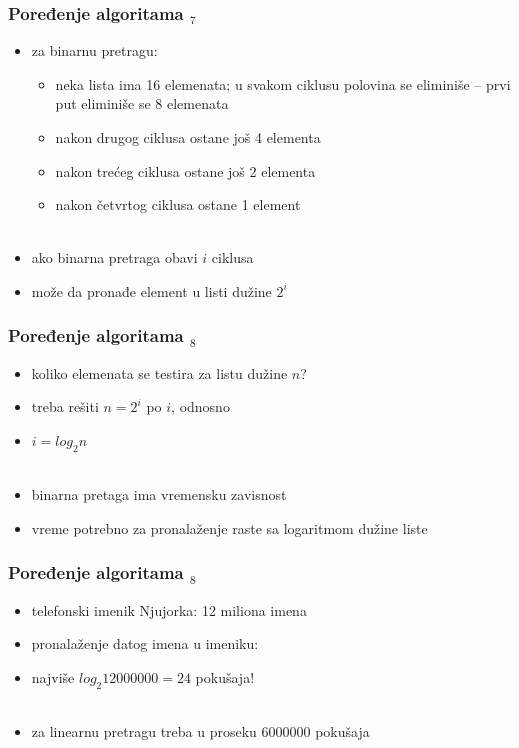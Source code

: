 \documentclass[utf8,compress,aspectratio=169]{beamer}
\begin{document}
\begin{frame}[fragile]
  \frametitle{Poređenje algoritama $_7$}
  \begin{itemize}
    \item za binarnu pretragu:
    \begin{itemize}
      \item neka lista ima 16 elemenata; u svakom ciklusu polovina se
        eliminiše -- prvi put eliminiše se 8 elemenata
      \item nakon drugog ciklusa ostane još 4 elementa
      \item nakon trećeg ciklusa ostane još 2 elementa
      \item nakon četvrtog ciklusa ostane 1 element \\ \ \\
    \end{itemize}
    \item ako binarna pretraga obavi $i$ ciklusa
    \item može da pronađe element u listi dužine $2^i$
  \end{itemize}
\end{frame}

\begin{frame}[fragile]
  \frametitle{Poređenje algoritama $_8$}
  \begin{itemize}
    \item koliko elemenata se testira za listu dužine $n$?
    \item treba rešiti $n = 2^i$ po $i$, odnosno
    \item $i = log_2 n$ \\ \ \\
    \item binarna pretaga ima  vremensku zavisnost
    \item vreme potrebno za pronalaženje raste sa logaritmom dužine liste
  \end{itemize}
\end{frame}

\begin{frame}[fragile]
  \frametitle{Poređenje algoritama $_8$}
  \begin{itemize}
    \item telefonski imenik Njujorka: 12 miliona imena
    \item pronalaženje datog imena u imeniku:
    \item najviše $log_2 12000000 = 24$ pokušaja! \\ \ \\
    \item za linearnu pretragu treba u proseku 6000000 pokušaja
  \end{itemize}
\end{frame}
\end{document}
